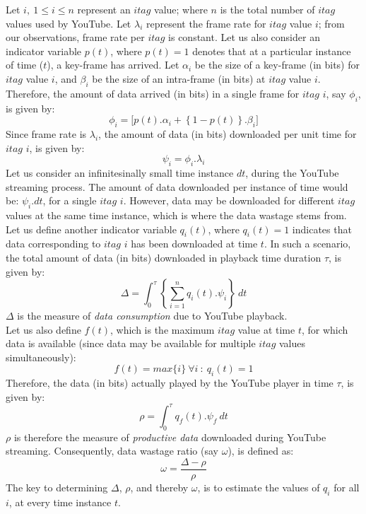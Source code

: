 Let $i,\ 1 \leq i \leq n$ represent an $itag$ value; where $n$ is the total number of $itag$ values used by YouTube.
Let $\lambda_i$ represent the frame rate for $itag$ value $i$; from our observations, frame rate per $itag$ is constant.
Let us also consider an indicator variable $p(t)$, where $p(t)=1$ denotes that at a particular instance of time ($t$), a key-frame has arrived.
Let $\alpha_i$ be the size of a key-frame (in bits) for $itag$ value $i$, and $\beta_i$ be the size of an intra-frame (in bits) at $itag$ value $i$.
Therefore, the amount of data arrived (in bits) in a single frame for $itag$ $i$, say $\phi_{i}$, is given by:
\begin{equation}
 \phi_i = \lbrack p(t).\alpha_i + \left\{1-p(t)\right\}.\beta_i \rbrack
\end{equation}
Since frame rate is $\lambda_i$, the amount of data (in bits) downloaded per unit time for $itag$ $i$, is given by:
\begin{equation}
 \psi_i = \phi_i.\lambda_i
\end{equation}
Let us consider an infinitesinally small time instance $dt$, during the YouTube streaming process. The amount of data downloaded per instance of time would be: $\psi_i.dt$, for a single $itag$ $i$.
However, data may be downloaded for different $itag$ values at the same time instance, which is where the data wastage stems from.
Let us define another indicator variable $q_{i}(t)$, where $q_{i}(t)=1$ indicates that data corresponding to $itag$ $i$ has been downloaded at time $t$.
In such a scenario, the total amount of data (in bits) downloaded in playback time duration $\tau$, is given by:
\begin{equation}
 \Delta = \int_{0}^{\tau} \left\{\sum_{i=1}^{n} q_{i}(t).\psi_{i}\right\}\ dt %
\end{equation}
$\Delta$ is the measure of {\it data consumption} due to YouTube playback.\\
Let us also define $f(t)$, which is the maximum $itag$ value at time $t$, for which data is available (since data may be available for multiple $itag$ values simultaneously):
\begin{equation}
 f(t) = max\{i\}\ \forall i\ :\ q_{i}(t) = 1
\end{equation}
Therefore, the data (in bits) actually played by the YouTube player in time $\tau$, is given by:
\begin{equation}
 \rho = \int_{0}^{\tau} q_{f}(t).\psi_{f}\ dt
\end{equation}
$\rho$ is therefore the measure of {\it productive data} downloaded during YouTube streaming.
Consequently, data wastage ratio (say $\omega$), is defined as:
\begin{equation}
 \omega = \frac{\Delta - \rho}{\rho}
\end{equation}
The key to determining $\Delta$, $\rho$, and thereby $\omega$, is to estimate the values of $q_{i}$ for all $i$, at every time instance $t$.

